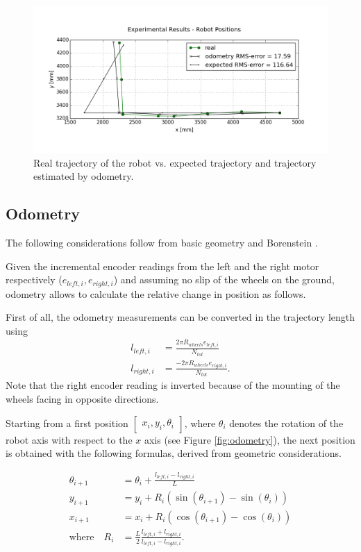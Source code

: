 \begin{figure}
	\centering
	\includegraphics[width=0.8\linewidth]{files/trajectory.png} 
	\caption{Real trajectory of the robot vs. expected trajectory and trajectory estimated by odometry.}
	\label{fig:trajectory}
\end{figure}

\subsection{Odometry}

The following considerations follow from basic geometry and Borenstein \cite{Borenstein1996}.

Given the incremental encoder readings from the left and the right motor respectively ($e_{left,i},e_{right,i}$) and assuming no slip of the wheels on the ground, odometry allows to calculate the relative change in position as follows.

First of all, the odometry measurements can be converted in the trajectory length using
\begin{align}
    l_{left,i} &= \frac{2\pi R_{wheels} e_{left,i}}{N_{tot}} \\
    l_{right,i} &= \frac{-2\pi R_{wheels} e_{right,i}}{N_{tot}}.
    \label{eq:encoders} 
\end{align}
Note that the right encoder reading is inverted because of the mounting of the wheels facing in opposite directions.

Starting from a first position $\begin{bmatrix} x_i,y_i,\theta_i \end{bmatrix}$, where $\theta_i$ denotes the rotation of the robot axis with respect to the $x$ axis (see Figure \ref{fig:odometry}), the next position is obtained with the following formulas, derived from geometric considerations.

\begin{subequations}
    \begin{align}
        \theta_{i+1} &= \theta_i + \frac{l_{left,i}-l_{right,i}}{L} \\
        y_{i+1} &= y_i + R_i (\sin(\theta_{i+1})-\sin(\theta_{i})) \\
        x_{i+1} &= x_i + R_i (\cos(\theta_{i+1})-\cos(\theta_i)) \\
        \text{where} \quad R_{i} &= \frac{L}{2} \frac{l_{left,i}+l_{right,i}}{l_{left,i}-l_{right,i}}.
    \label{eq:positions}
\end{align}
\end{subequations}

